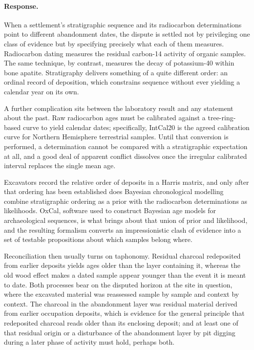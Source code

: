 \documentclass[11pt]{article}
\begin{document}
\paragraph{Response.} {\small When a settlement's stratigraphic sequence and its radiocarbon determinations point to different abandonment dates, the dispute is settled not by privileging one class of evidence but by specifying precisely what each of them measures. Radiocarbon dating measures the residual carbon-14 activity of organic samples. The same technique, by contrast, measures the decay of potassium-40 within bone apatite. Stratigraphy delivers something of a quite different order: an ordinal record of deposition, which constrains sequence without ever yielding a calendar year on its own.

A further complication sits between the laboratory result and any statement about the past. Raw radiocarbon ages must be calibrated against a tree-ring-based curve to yield calendar dates; specifically, IntCal20 is the agreed calibration curve for Northern Hemisphere terrestrial samples. Until that conversion is performed, a determination cannot be compared with a stratigraphic expectation at all, and a good deal of apparent conflict dissolves once the irregular calibrated interval replaces the single mean age.

Excavators record the relative order of deposits in a Harris matrix, and only after that ordering has been established does Bayesian chronological modelling combine stratigraphic ordering as a prior with the radiocarbon determinations as likelihoods. OxCal, software used to construct Bayesian age models for archaeological sequences, is what brings about that union of prior and likelihood, and the resulting formalism converts an impressionistic clash of evidence into a set of testable propositions about which samples belong where.

Reconciliation then usually turns on taphonomy. Residual charcoal redeposited from earlier deposits yields ages older than the layer containing it, whereas the old wood effect makes a dated sample appear younger than the event it is meant to date. Both processes bear on the disputed horizon at the site in question, where the excavated material was reassessed sample by sample and context by context. The charcoal in the abandonment layer was residual material derived from earlier occupation deposits, which is evidence for the general principle that redeposited charcoal reads older than its enclosing deposit; and at least one of that residual origin or a disturbance of the abandonment layer by pit digging during a later phase of activity must hold, perhaps both.

}
\end{document}

